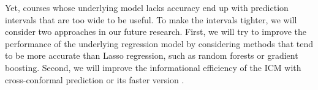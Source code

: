 \documentclass[pmlr]{jmlr}%
\begin{document}
Yet, courses whose underlying model lacks accuracy end up with prediction intervals that are too wide to be useful. To make the intervals tighter, we will consider two approaches in our future research. First, we will try to improve the performance of the underlying regression model by considering methods that tend to be more accurate than Lasso regression, such as random forests or gradient boosting. Second, we will improve the informational efficiency of the ICM with cross-conformal prediction \citep{Vovk.2015} or its faster version \citep{Beganovic.2018}.



\end{document}
